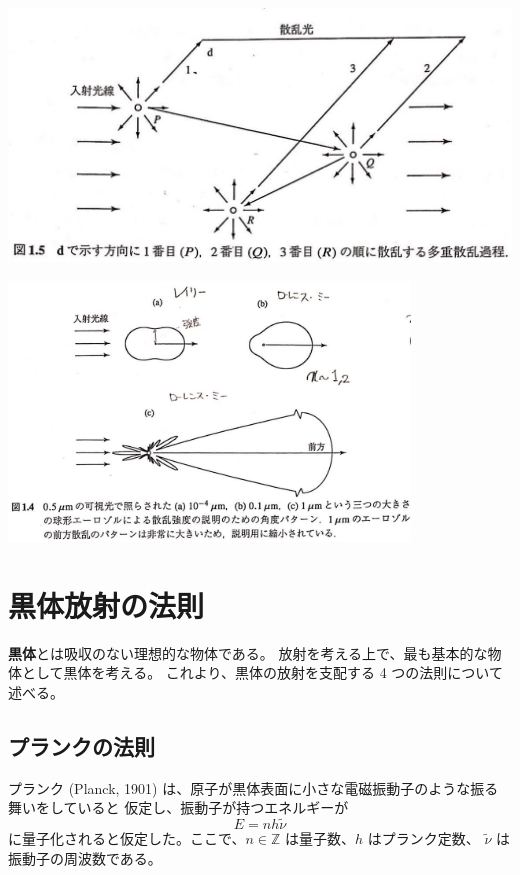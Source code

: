 \documentclass[article]{dennou777}
\newcommand{\centeralign}[1]{\rule{0pt}{0pt}\hfill#1\hfill\rule{0pt}{0pt}}
\newcommand{\hmemph}[1]{\textbf{#1}}
\begin{document}
\includegraphics[width=\linewidth]{mscatter.jpg}

\centeralign{\includegraphics[width=0.8\textwidth]{scatter.jpg}}

\section{黒体放射の法則}

\hmemph{黒体}とは吸収のない理想的な物体である。
放射を考える上で、最も基本的な物体として黒体を考える。
これより、黒体の放射を支配する 4 つの法則について述べる。

\subsection{プランクの法則}
プランク (Planck, 1901) は、原子が黒体表面に小さな電磁振動子のような振る舞いをしていると
仮定し、振動子が持つエネルギーが
\begin{equation}
	E=nh\tilde\nu
\end{equation}
に量子化されると仮定した。ここで、$n\in\mathbb{Z}$ は量子数、$h$ はプランク定数、
$\tilde\nu$ は振動子の周波数である。
\end{document}
